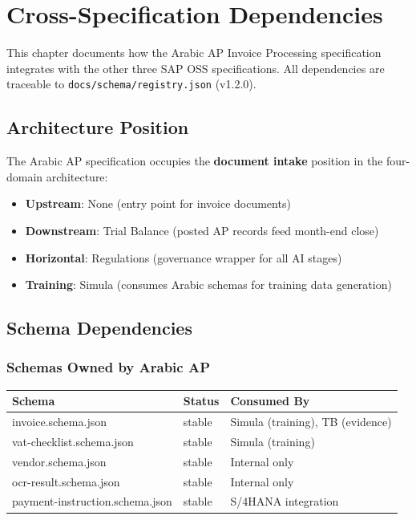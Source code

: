 
\chapter{Cross-Specification Dependencies}
\label{ch:cross-spec}

This chapter documents how the Arabic AP Invoice Processing specification
integrates with the other three SAP OSS specifications. All dependencies
are traceable to \texttt{docs/schema/registry.json} (v1.2.0).

\section{Architecture Position}
\label{sec:arch-position}

The Arabic AP specification occupies the \textbf{document intake} position in
the four-domain architecture:

\begin{itemize}
  \item \textbf{Upstream}: None (entry point for invoice documents)
  \item \textbf{Downstream}: Trial Balance (posted AP records feed month-end close)
  \item \textbf{Horizontal}: Regulations (governance wrapper for all AI stages)
  \item \textbf{Training}: Simula (consumes Arabic schemas for training data generation)
\end{itemize}

\section{Schema Dependencies}
\label{sec:schema-deps}

\subsection{Schemas Owned by Arabic AP}

\begin{tabularx}{\linewidth}{@{}l l X@{}}
\toprule
\textbf{Schema} & \textbf{Status} & \textbf{Consumed By} \\
\midrule
invoice.schema.json & stable & Simula (training), TB (evidence) \\
vat-checklist.schema.json & stable & Simula (training) \\
vendor.schema.json & stable & Internal only \\
ocr-result.schema.json & stable & Internal only \\
payment-instruction.schema.json & stable & S/4HANA integration \\
\bottomrule
\end{tabularx}

